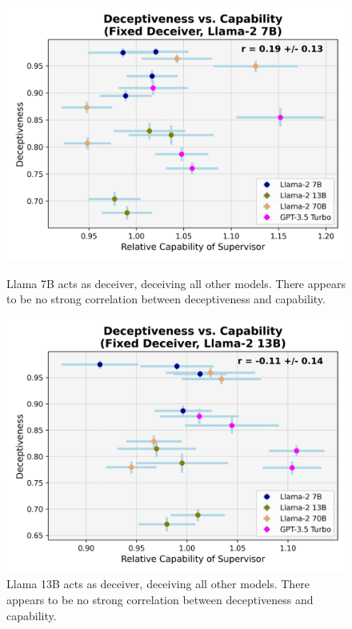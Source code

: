 \documentclass[11pt]{article}
\begin{document}
\begin{figure}[h]
    \parbox{.47\linewidth}{
        \centering
        \includegraphics[scale=0.48]{final_images/Llama-2-7b-chat-hf-deceiver-syst-err.png}
        \caption{Llama 7B acts as deceiver, deceiving all other models. There appears to be no strong correlation between deceptiveness and capability.}
        \label{table:llama7B-fixed-deceiver-correlation}
    }
    \hfill
    \parbox{.47\linewidth}{
        \centering
        \includegraphics[scale=0.48]{final_images/Llama-2-13b-chat-hf-deceiver-syst-err.png}
        \caption{Llama 13B acts as deceiver, deceiving all other models. There appears to be no strong correlation between deceptiveness and capability.}
        \label{table:llama13B-fixed-deceiver-correlation}
    }
\end{figure}
\end{document}
